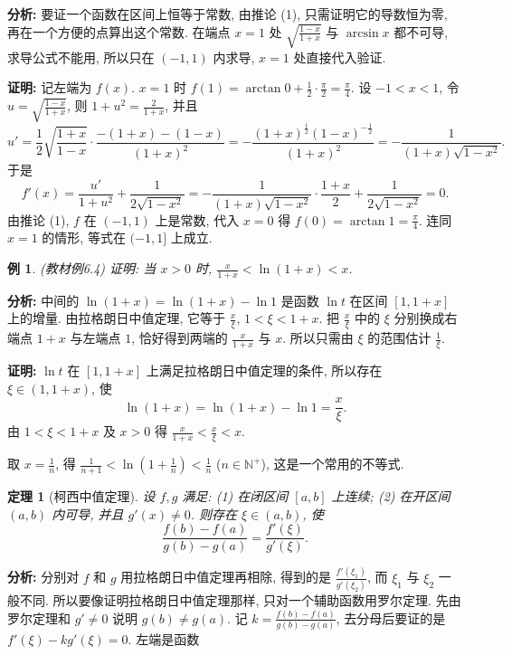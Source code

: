 \documentclass[UTF8,openany]{ctexbook}
\theoremstyle{chinesetextbook}
\newtheorem{example}{例}[section]
\newtheorem{theorem}{定理}[section]
\newenvironment{cnproof}{\par\indent\textbf{证明:} \ignorespaces}{\par}
\begin{document}
\par\indent\textbf{分析:} 要证一个函数在区间上恒等于常数, 由推论 (1), 只需证明它的导数恒为零, 再在一个方便的点算出这个常数. 在端点 $x=1$ 处 $\displaystyle\sqrt{\frac{1-x}{1+x}}$ 与 $\arcsin x$ 都不可导, 求导公式不能用, 所以只在 $(-1,1)$ 内求导, $x=1$ 处直接代入验证.
\begin{cnproof}
记左端为 $f(x)$. $x=1$ 时 $\displaystyle f(1)=\arctan0+\frac12\cdot\frac\pi2=\frac\pi4$. 设 $-1<x<1$, 令 $\displaystyle u=\sqrt{\frac{1-x}{1+x}}$, 则 $\displaystyle1+u^2=\frac2{1+x}$, 并且
\[
u'=\frac12\sqrt{\frac{1+x}{1-x}}\cdot\frac{-(1+x)-(1-x)}{(1+x)^2}=-\frac{(1+x)^{\frac12}(1-x)^{-\frac12}}{(1+x)^2}=-\frac1{(1+x)\sqrt{1-x^2}}.
\]
于是
\[
f'(x)=\frac{u'}{1+u^2}+\frac1{2\sqrt{1-x^2}}=-\frac1{(1+x)\sqrt{1-x^2}}\cdot\frac{1+x}2+\frac1{2\sqrt{1-x^2}}=0.
\]
由推论 (1), $f$ 在 $(-1,1)$ 上是常数, 代入 $x=0$ 得 $\displaystyle f(0)=\arctan1=\frac\pi4$. 连同 $x=1$ 的情形, 等式在 $(-1,1]$ 上成立.
\end{cnproof}
\begin{example}\label{ex:c2-6-4}
\textnormal{(教材例6.4)} 证明: 当 $x>0$ 时, $\displaystyle\frac x{1+x}<\ln(1+x)<x$.
\end{example}
\par\indent\textbf{分析:} 中间的 $\ln(1+x)=\ln(1+x)-\ln1$ 是函数 $\ln t$ 在区间 $[1,1+x]$ 上的增量. 由拉格朗日中值定理, 它等于 $\displaystyle\frac x\xi$, $1<\xi<1+x$. 把 $\displaystyle\frac x\xi$ 中的 $\xi$ 分别换成右端点 $1+x$ 与左端点 $1$, 恰好得到两端的 $\displaystyle\frac x{1+x}$ 与 $x$. 所以只需由 $\xi$ 的范围估计 $\displaystyle\frac1\xi$.
\begin{cnproof}
$\ln t$ 在 $[1,1+x]$ 上满足拉格朗日中值定理的条件, 所以存在 $\xi\in(1,1+x)$, 使
\[
\ln(1+x)=\ln(1+x)-\ln1=\frac x\xi.
\]
由 $1<\xi<1+x$ 及 $x>0$ 得 $\displaystyle\frac x{1+x}<\frac x\xi<x$.
\end{cnproof}
取 $\displaystyle x=\frac1n$, 得 $\displaystyle\frac1{n+1}<\ln\left(1+\frac1n\right)<\frac1n$ ($n\in\mathbb N^+$), 这是一个常用的不等式.
\begin{theorem}[柯西中值定理]\label{thm:c2-6-cauchy}
设 $f,g$ 满足: (1) 在闭区间 $[a,b]$ 上连续; (2) 在开区间 $(a,b)$ 内可导, 并且 $g'(x)\ne0$. 则存在 $\xi\in(a,b)$, 使
\[
\frac{f(b)-f(a)}{g(b)-g(a)}=\frac{f'(\xi)}{g'(\xi)}.
\]
\end{theorem}
\par\indent\textbf{分析:} 分别对 $f$ 和 $g$ 用拉格朗日中值定理再相除, 得到的是 $\displaystyle\frac{f'(\xi_1)}{g'(\xi_2)}$, 而 $\xi_1$ 与 $\xi_2$ 一般不同. 所以要像证明拉格朗日中值定理那样, 只对一个辅助函数用罗尔定理. 先由罗尔定理和 $g'\ne0$ 说明 $g(b)\ne g(a)$. 记 $\displaystyle k=\frac{f(b)-f(a)}{g(b)-g(a)}$, 去分母后要证的是 $f'(\xi)-kg'(\xi)=0$. 左端是函数
\end{document}
